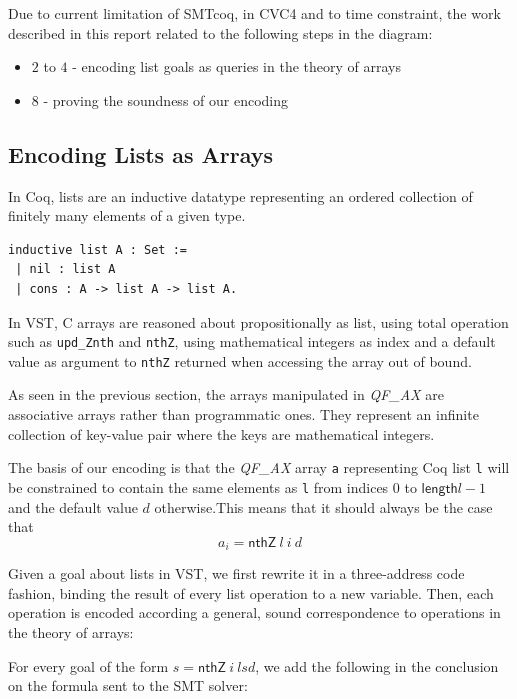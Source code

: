 \documentclass[onecolumn, preprint]{sigplanconf}
\begin{document}
Due to current limitation of SMTcoq, in CVC4 and to time constraint, the work described in this report related to the following steps in the diagram:
\begin{itemize}
  \item $2$ to $4$ - encoding list goals as queries in the theory of arrays
  \item $8$ - proving the soundness of our encoding
\end{itemize}







\subsection{Encoding Lists as Arrays}

In Coq, lists are an inductive datatype representing an ordered collection of finitely many elements of a given type. 
\begin{lstlisting}
inductive list A : Set :=
 | nil : list A
 | cons : A -> list A -> list A.
\end{lstlisting}

In VST, C arrays are reasoned about propositionally as list, using total operation such as \lstinline|upd_Znth| and \lstinline|nthZ|, using mathematical integers as index and a default value as argument to \lstinline|nthZ| returned when accessing the array out of bound. 

As seen in the previous section, the arrays manipulated in \emph{QF\_AX} are associative arrays rather than programmatic ones. They represent an infinite collection of key-value pair where the keys are mathematical integers. 

The basis of our encoding is that the \emph{QF\_AX} array \lstinline|a| representing Coq list \lstinline|l| will be constrained to contain the same elements as \lstinline|l| from indices $0$ to $\mathsf{length} l - 1$ and the default value $d$ otherwise.This means that it should always be the case that
$$ a_i = \textsf{nthZ}\ l\ i\ d$$

Given a goal about lists in VST, we first rewrite it in a three-address code fashion, binding the result of every list operation to a new variable. Then, each operation is encoded according a general, sound correspondence to operations in the theory of arrays:

For every goal of the form $s = \textsf{nthZ}\ i\ ls d$, we add the following in the conclusion on the formula sent to the SMT solver:
\end{document}
